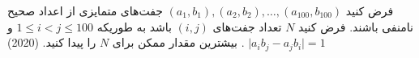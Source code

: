 فرض کنید $(a_1, b_1), (a_2, b_2), \dots, (a_{100}, b_{100})$ جفت‌های متمایزی از اعداد صحیح نامنفی باشند.
فرض کنید $N$ تعداد جفت‌های $(i, j)$ باشد به طوریکه $1 \le i < j \le 100$ و $\big| a_i b_j - a_j b_i \big| = 1$
. بیشترین مقدار ممکن برای $N$ را پیدا کنید.
(2020)